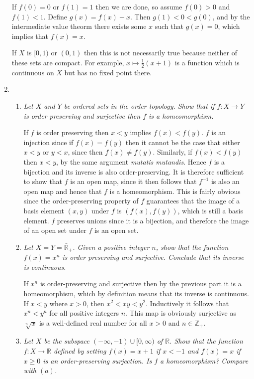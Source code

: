 \documentclass[10pt]{article}
\newcommand{\Z}{\mathbb{Z}}
\newcommand{\R}{\mathbb{R}}
\begin{document}
\begin{enumerate}
If $f(0) = 0$ or $f(1) = 1$ then we are done, so assume $f(0) > 0$ and $f(1) < 1$.  Define $g(x) = f(x) - x$.  Then $g(1) < 0 < g(0)$, and by the intermediate value theorm there exists some $x$ such that $g(x) = 0$, which implies that $f(x) = x$.

If $X$ is $[0,1)$ or $(0,1)$ then this is not necessarily true because neither of these sets are compact.  For example, $x \mapsto \frac{1}{2}(x+1)$ is a function which is continuous on $X$ but has no fixed point there.

\item
\begin{enumerate}
\item \emph{Let $X$ and $Y$ be ordered sets in the order topology.  Show that if $f: X \rightarrow Y$ is order preserving and surjective then $f$ is a homeomorphism.}

If $f$ is order preserving then $x < y$ implies $f(x) < f(y)$.  $f$ is an injection since if $f(x) = f(y)$ then it cannot be the case that either $x < y$ or $y < x$, since then $f(x) \neq f(y)$.  Similarly, if $f(x) < f(y)$ then $x < y$, by the same argument \emph{mutatis mutandis}.  Hence $f$ is a bijection and its inverse is also order-preserving.  It is therefore sufficient to show that $f$ is an open map, since it then follows that $f^{-1}$ is also an open map and hence that $f$ is a homeomorphism.  This is fairly obvious since the order-preserving property of $f$ guarantees that the image of a basis element $(x,y)$ under $f$ is $(f(x), f(y))$, which is still a basis element.  $f$ preserves unions since it is a bijection, and therefore the image of an open set under $f$ is an open set.


\item \emph{Let $X = Y = \bar{\R}_+$.  Given a positive integer $n$, show that the function $f(x) = x^n$ is order preserving and surjective.  Conclude that its inverse is continuous.}

If $x^n$ is order-preserving and surjective then by the previous part it is a homeomorphism, which by definition means that its inverse is continuous.  If $x < y$ where $x > 0$, then $x^2 < xy < y^2$.  Inductively it follows that $x^n < y^n$ for all positive integers $n$.  This map is obviously surjective as $\sqrt[n]{x}$ is a well-defined real number for all $x > 0$ and $n \in \Z_+$.

\item \emph{Let $X$ be the subspace $(-\infty, -1) \cup [0, \infty)$ of $\R$.  Show that the function $f: X \rightarrow \R$ defined by setting $f(x) = x+1$ if $x < -1$ and $f(x) = x$ if $x \geq 0$ is an order-preserving surjection.  Is $f$ a homeomorphism?  Compare with $(a)$.}


\end{enumerate}
\end{enumerate}
\end{document}
